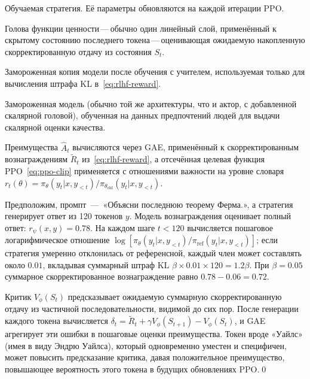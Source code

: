 \begin{description}[leftmargin=!, labelwidth=3.5cm]
  \item[Актор $\pi_\theta$] Обучаемая стратегия. Её параметры обновляются на каждой итерации PPO.
  \item[Критик $V_\phi$] Голова функции ценности\,---\,обычно один линейный слой, применённый к скрытому состоянию последнего токена\,---\,оценивающая ожидаемую накопленную скорректированную отдачу из состояния $S_t$.
  \item[Референсная модель $\pi_{\mathrm{ref}}$] Замороженная копия модели после обучения с учителем, используемая только для вычисления штрафа KL в~\eqref{eq:rlhf-reward}.
  \item[Модель вознаграждения $r_\psi$] Замороженная модель (обычно той же архитектуры, что и актор, с добавленной скалярной головой), обученная на данных предпочтений людей для выдачи скалярной оценки качества.
\end{description}

Преимущества $\hat{A}_t$ вычисляются через GAE, применённый к скорректированным вознаграждениям $\tilde{R}_t$ из~\eqref{eq:rlhf-reward}, а отсечённая целевая функция PPO~\eqref{eq:ppo-clip} применяется с отношениями важности на уровне словаря $r_t(\theta) = \pi_\theta(y_t|x,y_{<t}) / \pi_{\theta_\mathrm{old}}(y_t|x,y_{<t})$.

\begin{example}
\label{ex:ppo-rlhf}
Предположим, промпт \,---\, «Объясни последнюю теорему Ферма.», а стратегия генерирует ответ из 120 токенов $y$. Модель вознаграждения оценивает полный ответ: $r_\psi(x,y) = 0.78$. На каждом шаге $t < 120$ вычисляется пошаговое логарифмическое отношение $\log[\pi_\theta(y_t|x,y_{<t})/\pi_{\mathrm{ref}}(y_t|x,y_{<t})]$; если стратегия умеренно отклонилась от референсной, каждый член может составлять около $0.01$, вкладывая суммарный штраф KL $\beta \times 0.01 \times 120 = 1.2\beta$. При $\beta = 0.05$ суммарное скорректированное вознаграждение равно $0.78 - 0.06 = 0.72$.

Критик $V_\phi(S_t)$ предсказывает ожидаемую суммарную скорректированную отдачу из частичной последовательности, видимой до сих пор. После генерации каждого токена вычисляется $\delta_t = \tilde{R}_t + \gamma V_\phi(S_{t+1}) - V_\phi(S_t)$, и GAE агрегирует эти ошибки в пошаговые оценки преимущества. Токен вроде «Уайлс» (имея в виду Эндрю Уайлса), который одновременно уместен и специфичен, может повысить предсказание критика, давая положительное преимущество, повышающее вероятность этого токена в будущих обновлениях PPO.\qed
\end{example}

